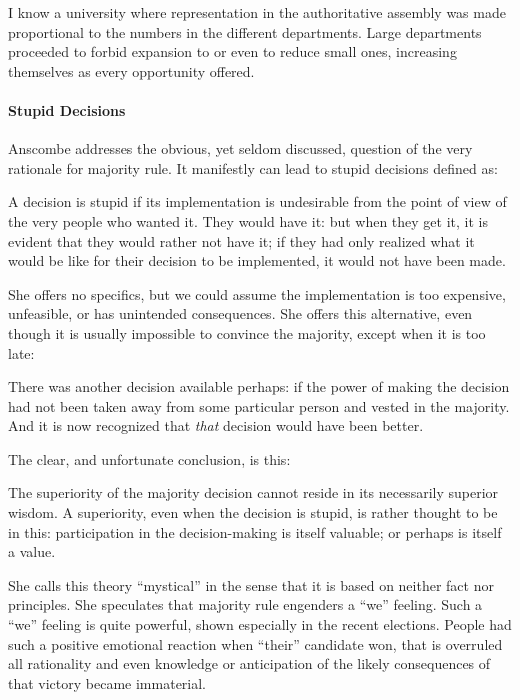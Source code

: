 \begin{quotex}
I know a university where representation in the authoritative assembly was made proportional to the numbers in the different departments. Large departments proceeded to forbid expansion to or even to reduce small ones, increasing themselves as every opportunity offered.
\end{quotex}


\paragraph{Stupid Decisions}


Anscombe addresses the obvious, yet seldom discussed, question of the very rationale for majority rule. It manifestly can lead to stupid decisions defined as:

\begin{quotex}
A decision is stupid if its implementation is undesirable from the point of view of the very people who wanted it. They would have it: but when they get it, it is evident that they would rather not have it; if they had only realized what it would be like for their decision to be implemented, it would not have been made.
\end{quotex}


She offers no specifics, but we could assume the implementation is too expensive, unfeasible, or has unintended consequences. She offers this alternative, even though it is usually impossible to convince the majority, except when it is too late:

\begin{quotex}
There was another decision available perhaps: if the power of making the decision had not been taken away from some particular person and vested in the majority. And it is now recognized that \emph{that} decision would have been better.
\end{quotex}


The clear, and unfortunate conclusion, is this:

\begin{quotex}
The superiority of the majority decision cannot reside in its necessarily superior wisdom. A superiority, even when the decision is stupid, is rather thought to be in this: participation in the decision-making is itself valuable; or perhaps is itself a value.
\end{quotex}


She calls this theory ``mystical'' in the sense that it is based on neither fact nor principles. She speculates that majority rule engenders a ``we'' feeling. Such a ``we'' feeling is quite powerful, shown especially in the recent elections. People had such a positive emotional reaction when ``their'' candidate won, that is overruled all rationality and even knowledge or anticipation of the likely consequences of that victory became immaterial.

